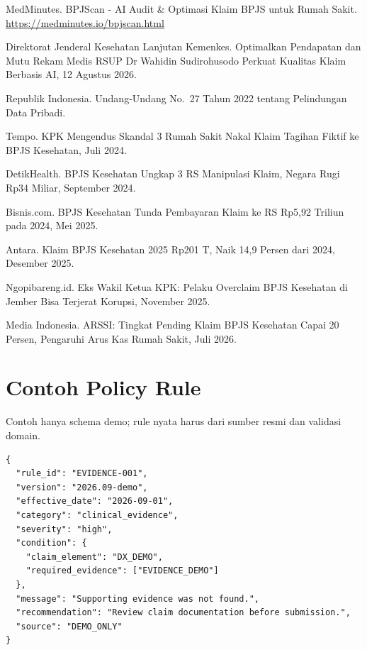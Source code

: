 \documentclass[11pt,a4paper]{article}
\begin{document}
\begin{enumerate}[label={[\arabic*]},leftmargin=*]
\item MedMinutes. BPJScan - AI Audit \& Optimasi Klaim BPJS untuk Rumah Sakit. \url{https://medminutes.io/bpjscan.html}
\item Direktorat Jenderal Kesehatan Lanjutan Kemenkes. Optimalkan Pendapatan dan Mutu Rekam Medis RSUP Dr Wahidin Sudirohusodo Perkuat Kualitas Klaim Berbasis AI, 12 Agustus 2026.
\item Republik Indonesia. Undang-Undang No.\ 27 Tahun 2022 tentang Pelindungan Data Pribadi.
\item Tempo. KPK Mengendus Skandal 3 Rumah Sakit Nakal Klaim Tagihan Fiktif ke BPJS Kesehatan, Juli 2024.
\item DetikHealth. BPJS Kesehatan Ungkap 3 RS Manipulasi Klaim, Negara Rugi Rp34 Miliar, September 2024.
\item Bisnis.com. BPJS Kesehatan Tunda Pembayaran Klaim ke RS Rp5,92 Triliun pada 2024, Mei 2025.
\item Antara. Klaim BPJS Kesehatan 2025 Rp201 T, Naik 14,9 Persen dari 2024, Desember 2025.
\item Ngopibareng.id. Eks Wakil Ketua KPK: Pelaku Overclaim BPJS Kesehatan di Jember Bisa Terjerat Korupsi, November 2025.
\item Media Indonesia. ARSSI: Tingkat Pending Klaim BPJS Kesehatan Capai 20 Persen, Pengaruhi Arus Kas Rumah Sakit, Juli 2026.
\end{enumerate}

\appendix
\section{Contoh Policy Rule}
Contoh hanya schema demo; rule nyata harus dari sumber resmi dan validasi domain.
\begin{verbatim}
{
  "rule_id": "EVIDENCE-001",
  "version": "2026.09-demo",
  "effective_date": "2026-09-01",
  "category": "clinical_evidence",
  "severity": "high",
  "condition": {
    "claim_element": "DX_DEMO",
    "required_evidence": ["EVIDENCE_DEMO"]
  },
  "message": "Supporting evidence was not found.",
  "recommendation": "Review claim documentation before submission.",
  "source": "DEMO_ONLY"
}
\end{verbatim}
\end{document}

